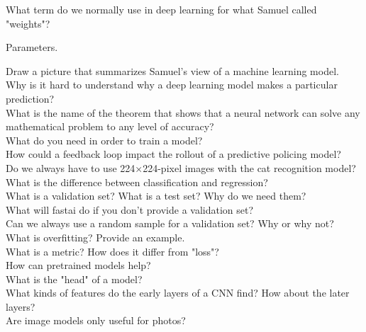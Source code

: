 \documentclass[12pt,a4paper]{article}
\begin{document}
What term do we normally use in deep learning for what Samuel called "weights"? \\

\smallbreak

Parameters.

Draw a picture that summarizes Samuel's view of a machine learning model. \\

Why is it hard to understand why a deep learning model makes a particular prediction? \\

What is the name of the theorem that shows that a neural network can solve any mathematical problem to any level of accuracy? \\

What do you need in order to train a model? \\

How could a feedback loop impact the rollout of a predictive policing model? \\

Do we always have to use 224×224-pixel images with the cat recognition model? \\

What is the difference between classification and regression? \\

What is a validation set? What is a test set? Why do we need them? \\

What will fastai do if you don't provide a validation set? \\

Can we always use a random sample for a validation set? Why or why not? \\

What is overfitting? Provide an example. \\

What is a metric? How does it differ from "loss"? \\

How can pretrained models help? \\

What is the "head" of a model? \\

What kinds of features do the early layers of a CNN find? How about the later layers? \\

Are image models only useful for photos? \\
\end{document}
